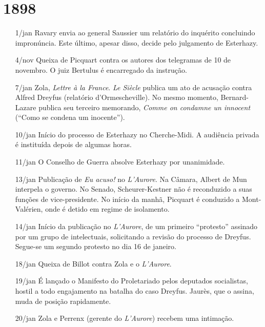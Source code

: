 \section{1898}
\begin{itemize}
\setlength\itemsep{-1mm}
\item[1/jan] Ravary envia ao general Saussier um relatório do inquérito
concluindo impronúncia. Este último, apesar disso, decide pelo julgamento de
Esterhazy.  

\item[4/nov] Queixa de Picquart contra os autores dos telegramas de 10 de
novembro. O juiz Bertulus é encarregado da instrução.

\item[7/jan] Zola, \textit{Lettre à la France}. \textit{Le Siècle} publica um
ato de acusação contra Alfred Dreyfus (relatório d'Ormescheville). No mesmo
momento, Bernard-Lazare publica seu terceiro memorando, \textit{Comme on
condamne un innocent} (``Como se condena um inocente''). 

\item[10/jan] Início do processo de Esterhazy no Cherche-Midi. A audiência
privada é instituída depois de algumas horas.

\item[11/jan] O Conselho de Guerra absolve Esterhazy por unanimidade.  

\item[13/jan] Publicação de \textit{Eu acuso! } no \textit{L'Aurore}. Na
Câmara, Albert de Mun interpela o governo. No Senado, Scheurer-Kestner não é
reconduzido a suas funções de vice-presidente. No início da manhã, Picquart é
conduzido a Mont-Valérien, onde é detido em regime de isolamento.   

\item[14/jan] Início da publicação no \textit{L'Aurore}, de um primeiro
``protesto'' assinado por um grupo de intelectuais, solicitando a revisão do
processo de Dreyfus. Segue-se um segundo protesto no dia 16 de janeiro.

\item[18/jan]  Queixa de Billot contra Zola e o \textit{L'Aurore}.

\item[19/jan] É lançado o Manifesto do Proletariado pelos deputados
socialistas, hostil a todo engajamento na batalha do caso Dreyfus. Jaurès, que
o assina, muda de posição rapidamente. 

\item[20/jan] Zola e Perrenx (gerente do \textit{L'Aurore}) recebem uma
intimação.


\end{itemize}
